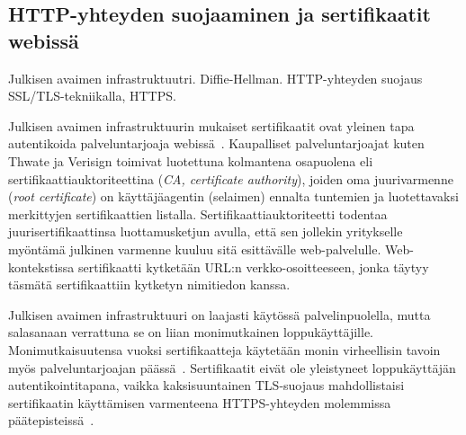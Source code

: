 \documentclass[finnish,gradu]{tktltiki}
\begin{document}




  \subsection{HTTP-yhteyden suojaaminen ja sertifikaatit webissä} %
  \label{sub:sertifikaatit_webissä}
  Julkisen avaimen infrastruktuutri.
  Diffie-Hellman.
  HTTP-yhteyden suojaus SSL/TLS-tekniikalla, HTTPS.

  Julkisen avaimen infrastruktuurin mukaiset sertifikaatit ovat yleinen tapa autentikoida palveluntarjoaja webissä~\cite{id_in_federation_systems_2005}. Kaupalliset palveluntarjoajat kuten Thwate ja Verisign toimivat luotettuna kolmantena osapuolena eli sertifikaattiauktoriteettina (\emph{CA, certificate authority}), joiden oma juurivarmenne (\emph{root certificate}) on käyttäjäagentin (selaimen) ennalta tuntemien ja luotettavaksi merkittyjen sertifikaattien listalla. Sertifikaattiauktoriteetti todentaa juurisertifikaattinsa luottamusketjun avulla, että sen jollekin yritykselle myöntämä julkinen varmenne kuuluu sitä esittävälle web-palvelulle. Web-kontekstissa sertifikaatti kytketään URL:n verkko-osoitteeseen, jonka täytyy täsmätä sertifikaattiin kytketyn nimitiedon kanssa.

  Julkisen avaimen infrastruktuuri on laajasti käytössä palvelinpuolella, mutta salasanaan verrattuna se on liian monimutkainen loppukäyttäjille. Monimutkaisuutensa vuoksi sertifikaatteja käytetään monin virheellisin tavoin myös palveluntarjoajan päässä~\cite{eff_ssliverse}. Sertifikaatit eivät ole yleistyneet loppukäyttäjän autentikointitapana, vaikka kaksisuuntainen TLS-suojaus mahdollistaisi sertifikaatin käyttämisen varmenteena HTTPS-yhteyden molemmissa päätepisteissä~\cite{henry_story_foaf_ssl, webid_home}.
\end{document}
